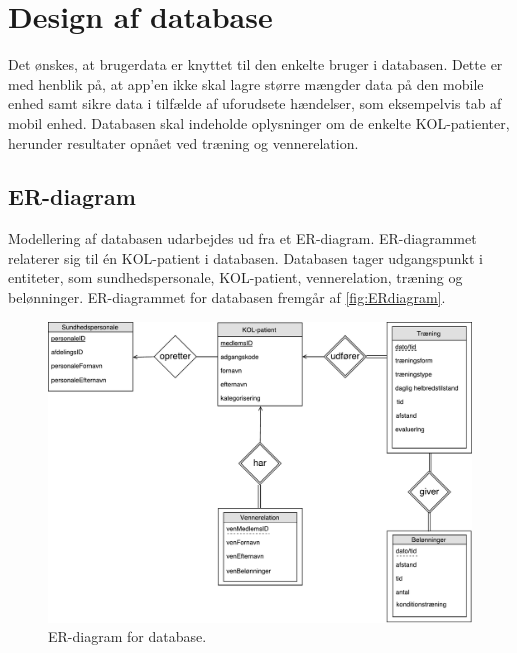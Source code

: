 \section{Design af database} \label{sec:ER}
Det ønskes, at brugerdata er knyttet til den enkelte bruger i databasen. Dette er med henblik på, at app'en ikke skal lagre større mængder data på den mobile enhed samt sikre data i tilfælde af uforudsete hændelser, som eksempelvis tab af mobil enhed. Databasen skal indeholde oplysninger om de enkelte KOL-patienter, herunder resultater opnået ved træning og vennerelation. 

\subsection{ER-diagram}
Modellering af databasen udarbejdes ud fra et ER-diagram. ER-diagrammet relaterer sig til én KOL-patient i databasen. Databasen tager udgangspunkt i entiteter, som sundhedspersonale, KOL-patient, vennerelation, træning og belønninger. ER-diagrammet for databasen fremgår af \autoref{fig:ERdiagram}.

\begin{figure} [H]
\centering
\includegraphics[width=1\textwidth]{figures/Aktivitetsdiagram/ERdiagram}
\caption{ER-diagram for database.}
\label{fig:ERdiagram}
\end{figure} 

